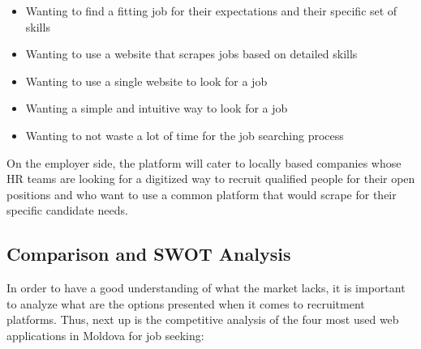 \begin{itemize}
    \item Wanting to find a fitting job for their expectations and their specific set of skills
    \item Wanting to use a website that scrapes jobs based on detailed skills
    \item Wanting to use a single website to look for a job
    \item Wanting a simple and intuitive way to look for a job
    \item Wanting to not waste a lot of time for the job searching process 
\end{itemize}

\par On the employer side, the platform will cater to locally based companies whose HR teams are looking for a digitized way to recruit qualified people for their open positions and who want to use a common platform that would scrape for their specific candidate needs.


\subsection{Comparison and SWOT Analysis}

\par In order to have a good understanding of what the market lacks, it is important to analyze what are the options presented when it comes to recruitment platforms. Thus, next up is the competitive analysis of the four most used web applications in Moldova for job seeking: 

